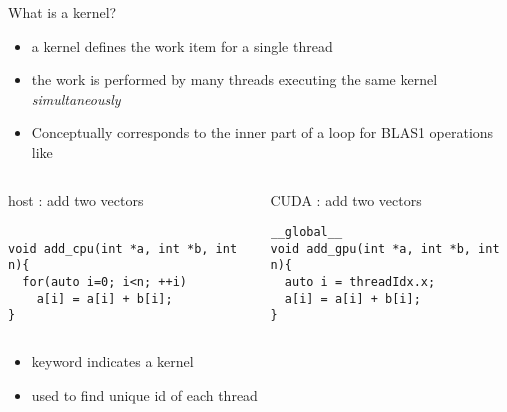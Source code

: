 \begin{frame}[fragile]{}
    \begin{info}{What is a kernel?}
    \begin{itemize}
        \item a kernel defines the work item for a single thread
        \item the work is performed by many threads executing the same kernel \emph{simultaneously}
        \item Conceptually corresponds to the inner part of a loop for BLAS1 operations like \axpy
    \end{itemize}
    \end{info}

    \vspace{-10pt}
    \begin{columns}[T]
        \begin{column}{0.5\textwidth}
            \begin{codecolumn}{host : add two vectors}
        \begin{lstlisting}[style=boxcudatiny]

void add_cpu(int *a, int *b, int n){
  for(auto i=0; i<n; ++i)
    a[i] = a[i] + b[i];
}
        \end{lstlisting}
            \end{codecolumn}
        \end{column}
        \begin{column}{0.5\textwidth}
            \begin{codecolumn}{CUDA : add two vectors}
        \begin{lstlisting}[style=boxcudatiny]
__global__
void add_gpu(int *a, int *b, int n){
  auto i = threadIdx.x;
  a[i] = a[i] + b[i];
}
        \end{lstlisting}
            \end{codecolumn}
        \end{column}
    \end{columns}

    \vspace{-2pt}
    \begin{info}{}
    \begin{itemize}
        \item {} keyword indicates a kernel
        \item {} used to find unique id of each thread
    \end{itemize}
    \end{info}
\end{frame}

